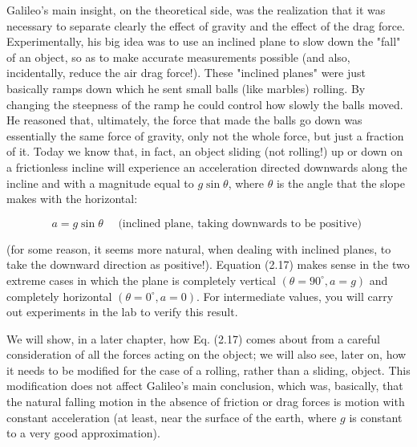 \documentclass[10pt]{article}
\begin{document}
Galileo's main insight, on the theoretical side, was the realization that it was necessary to separate clearly the effect of gravity and the effect of the drag force. Experimentally, his big idea was to use an inclined plane to slow down the "fall" of an object, so as to make accurate measurements possible (and also, incidentally, reduce the air drag force!). These "inclined planes" were just basically ramps down which he sent small balls (like marbles) rolling. By changing the steepness of the ramp he could control how slowly the balls moved. He reasoned that, ultimately, the force that made the balls go down was essentially the same force of gravity, only not the whole force, but just a fraction of it. Today we know that, in fact, an object sliding (not rolling!) up or down on a frictionless incline will experience an acceleration directed downwards along the incline and with a magnitude equal to $g \sin \theta$, where $\theta$ is the angle that the slope makes with the horizontal:


\begin{equation*}
a=g \sin \theta \quad \text { (inclined plane, taking downwards to be positive) } \tag{2.17}
\end{equation*}


(for some reason, it seems more natural, when dealing with inclined planes, to take the downward direction as positive!). Equation (2.17) makes sense in the two extreme cases in which the plane is completely vertical $\left(\theta=90^{\circ}, a=g\right)$ and completely horizontal $\left(\theta=0^{\circ}, a=0\right)$. For intermediate values, you will carry out experiments in the lab to verify this result.

We will show, in a later chapter, how Eq. (2.17) comes about from a careful consideration of all the forces acting on the object; we will also see, later on, how it needs to be modified for the case of a rolling, rather than a sliding, object. This modification does not affect Galileo's main conclusion, which was, basically, that the natural falling motion in the absence of friction or drag forces is motion with constant acceleration (at least, near the surface of the earth, where $g$ is constant to a very good approximation).
\end{document}
